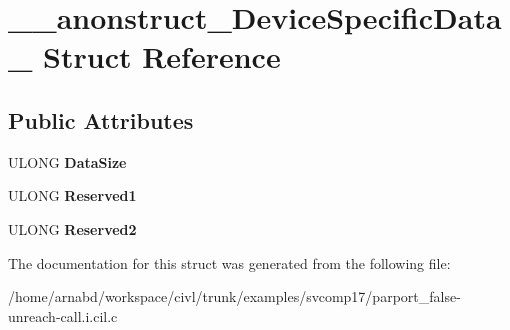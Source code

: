 \hypertarget{struct____anonstruct__DeviceSpecificData__23}{}\section{\+\_\+\+\_\+anonstruct\+\_\+\+Device\+Specific\+Data\+\_ Struct Reference}
\label{struct____anonstruct__DeviceSpecificData__23}
\subsection*{Public Attributes}
\begin{DoxyCompactItemize}
\item 
\hypertarget{struct____anonstruct__DeviceSpecificData__23_a38f50738af3e64dbc5fdd9dcb401d895}{}U\+L\+O\+N\+G {\bfseries Data\+Size}\label{struct____anonstruct__DeviceSpecificData__23_a38f50738af3e64dbc5fdd9dcb401d895}

\item 
\hypertarget{struct____anonstruct__DeviceSpecificData__23_a7ea7cd1870317b5dab9ff8db75641da7}{}U\+L\+O\+N\+G {\bfseries Reserved1}\label{struct____anonstruct__DeviceSpecificData__23_a7ea7cd1870317b5dab9ff8db75641da7}

\item 
\hypertarget{struct____anonstruct__DeviceSpecificData__23_a8cb80764054b96ba81ef33024b728d2f}{}U\+L\+O\+N\+G {\bfseries Reserved2}\label{struct____anonstruct__DeviceSpecificData__23_a8cb80764054b96ba81ef33024b728d2f}

\end{DoxyCompactItemize}


The documentation for this struct was generated from the following file\+:\begin{DoxyCompactItemize}
\item 
/home/arnabd/workspace/civl/trunk/examples/svcomp17/parport\+\_\+false-\/unreach-\/call.\+i.\+cil.\+c\end{DoxyCompactItemize}
